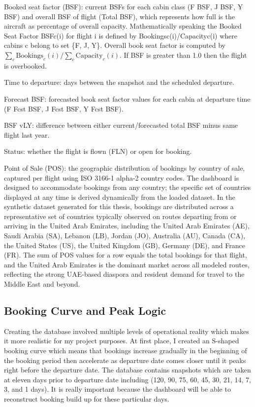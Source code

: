 Booked seat factor (BSF): current BSFs for each cabin class (F BSF, J BSF, Y BSF) and overall BSF of flight (Total BSF), which represents how full is the aircraft as percentage of overall capacity. Mathematically speaking the Booked Seat Factor BSFc(i) for flight i is defined by Bookingsc(i)/Capacityc(i) where cabins c belong to set \{F, J, Y\}. Overall book seat factor is computed by $\sum_{c} \text{Bookings}_c(i) / \sum_{c} \text{Capacity}_c(i)$. If BSF is greater than 1.0 then the flight is overbooked.

Time to departure: days between the snapshot and the scheduled departure.

Forecast BSF: forecasted book seat factor values for each cabin at departure time (F Fcst BSF, J Fcst BSF, Y Fcst BSF).

BSF vLY: difference between either current/forecasted total BSF minus same flight last year.

Status: whether the flight is flown (FLN) or open for booking.

Point of Sale (POS): the geographic distribution of bookings by country of sale, captured per flight using ISO 3166-1 alpha-2 country codes. The dashboard is designed to accommodate bookings from any country; the specific set of countries displayed at any time is derived dynamically from the loaded dataset. In the synthetic dataset generated for this thesis, bookings are distributed across a representative set of countries typically observed on routes departing from or arriving in the United Arab Emirates, including the United Arab Emirates (AE), Saudi Arabia (SA), Lebanon (LB), Jordan (JO), Australia (AU), Canada (CA), the United States (US), the United Kingdom (GB), Germany (DE), and France (FR). The sum of POS values for a row equals the total bookings for that flight, and the United Arab Emirates is the dominant market across all modeled routes, reflecting the strong UAE-based diaspora and resident demand for travel to the Middle East and beyond.

\subsection{Booking Curve and Peak Logic}

Creating the database involved multiple levels of operational reality which makes it more realistic for my project purposes. At first place, I created an S-shaped booking curve which means that bookings increase gradually in the beginning of the booking period then accelerate as departure date comes closer until it peaks right before the departure date. The database contains snapshots which are taken at eleven days prior to departure date including (120, 90, 75, 60, 45, 30, 21, 14, 7, 3, and 1 days). It is really important because the dashboard will be able to reconstruct booking build up for these particular days.

